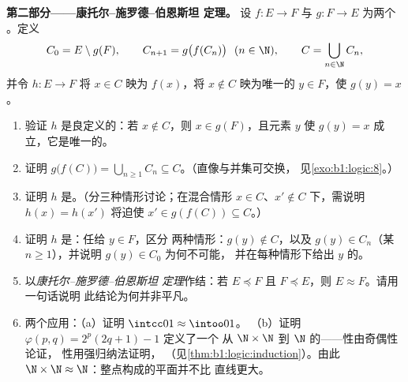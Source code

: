 \begin{problem}
\medskip
\noindent\textbf{第二部分——康托尔--施罗德--伯恩斯坦
定理。} 设 $f \colon E \to F$ 与 $g \colon F \to E$ 为两个
。定义
\[
C_0 = E \setminus g(F), \qquad C_{n+1} = g\bigl(f(C_n)\bigr)
\ \ (n \in \N), \qquad C = \bigcup_{n \in \N} C_n,
\]
并令 $h \colon E \to F$ 将 $x \in C$ 映为 $f(x)$，将 $x \notin C$
映为唯一的 $y \in F$，使 $g(y) = x$。
\begin{enumerate}[resume]
  \item 验证 $h$ 是良定义的：若 $x \notin C$，则 $x \in
        g(F)$，且元素 $y$ 使 $g(y) = x$ 成立，它是唯一的。
  \item 证明 $g\bigl(f(C)\bigr) = \bigcup_{n \geq 1} C_n
        \subseteq C$。（直像与并集可交换，
        见\cref{exo:b1:logic:8}。）
  \item 证明 $h$ 是。（分三种情形讨论；在混合情形
        $x \in C$、$x' \notin C$ 下，需说明 $h(x) = h(x')$
        将迫使 $x' \in g(f(C)) \subseteq C$。）
  \item 证明 $h$ 是：任给 $y \in F$，区分
        两种情形：$g(y) \notin C$，以及 $g(y) \in C_n$（某 $n
        \geq 1$），并说明 $g(y) \in C_0$ 为何不可能，
        并在每种情形下给出 $y$ 的。
  \item 以\emph{康托尔--施罗德--伯恩斯坦
        定理}作结：若 $E \preceq F$ 且 $F \preceq E$，则 $E
        \approx F$。请用一句话说明
        此结论为何并非平凡。
  \item 两个应用：（a）证明 $\intcc01 \approx \intoo01$。
        （b）证明 $\varphi(p, q) = 2^p(2q + 1) - 1$ 定义了一个
        从 $\N \times \N$ 到 $\N$ 的——性由奇偶性论证，
        性用强归纳法证明，
        （见\cref{thm:b1:logic:induction}）。由此 $\N \times \N \approx
        \N$：整点构成的平面并不比
        直线更大。
\end{enumerate}


\end{problem}
